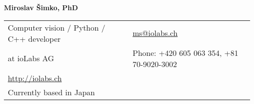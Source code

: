 \documentclass[a4paper,11pt,oneside]{article}
\begin{document}

\noindent  \LARGE{\textbf{Miroslav Šimko, PhD}}  \\
\vspace{-2ex}
\normalsize


\begin{center}
\begin{tabular}{l l}
 Computer vision / Python / C++ developer & \hspace{1in} \href{mailto:ms@iolabs.ch}{ms@iolabs.ch} \\
 at ioLabs AG       & \hspace{1in} Phone: +420 605 063 354, +81 70-9020-3002 \\
  \url{http://iolabs.ch} & \\
  Currently based in Japan
\end{tabular}
\end{center}

\vspace{1em}

\end{document}
